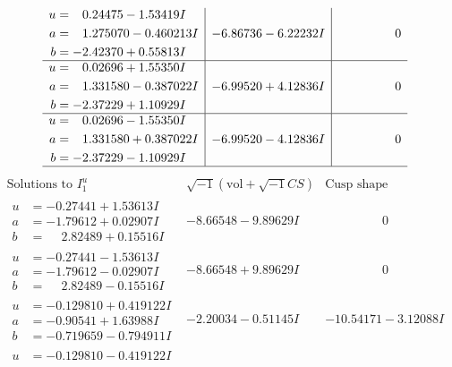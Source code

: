 \documentclass[1p]{elsarticle_modified}
\theoremstyle{definition}
\newcommand{\I}{\sqrt{-1}}
\begin{document}
$$\begin{array}{c|c|c}
\begin{aligned}
u &= \phantom{-}0.24475 - 1.53419 I \\
a &= \phantom{-}1.275070 - 0.460213 I \\
b &= -2.42370 + 0.55813 I\end{aligned}
 & -6.86736 - 6.22232 I & \phantom{-0.000000 } 0 \\ \hline\begin{aligned}
u &= \phantom{-}0.02696 + 1.55350 I \\
a &= \phantom{-}1.331580 - 0.387022 I \\
b &= -2.37229 + 1.10929 I\end{aligned}
 & -6.99520 + 4.12836 I & \phantom{-0.000000 } 0 \\ \hline\begin{aligned}
u &= \phantom{-}0.02696 - 1.55350 I \\
a &= \phantom{-}1.331580 + 0.387022 I \\
b &= -2.37229 - 1.10929 I\end{aligned}
 & -6.99520 - 4.12836 I & \phantom{-0.000000 } 0\\
 \hline 
 \end{array}$$\newpage$$\begin{array}{c|c|c}  
\text{Solutions to }I^u_{1}& \I (\text{vol} + \sqrt{-1}CS) & \text{Cusp shape}\\
 \hline 
\begin{aligned}
u &= -0.27441 + 1.53613 I \\
a &= -1.79612 + 0.02907 I \\
b &= \phantom{-}2.82489 + 0.15516 I\end{aligned}
 & -8.66548 - 9.89629 I & \phantom{-0.000000 } 0 \\ \hline\begin{aligned}
u &= -0.27441 - 1.53613 I \\
a &= -1.79612 - 0.02907 I \\
b &= \phantom{-}2.82489 - 0.15516 I\end{aligned}
 & -8.66548 + 9.89629 I & \phantom{-0.000000 } 0 \\ \hline\begin{aligned}
u &= -0.129810 + 0.419122 I \\
a &= -0.90541 + 1.63988 I \\
b &= -0.719659 - 0.794911 I\end{aligned}
 & -2.20034 - 0.51145 I & -10.54171 - 3.12088 I \\ \hline\begin{aligned}
u &= -0.129810 - 0.419122 I \\

\end{aligned}
\end{array}$$
\end{document}
